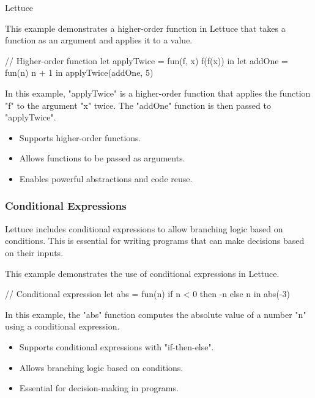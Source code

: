 \begin{notes}{Lettuce}
\begin{highlight}
        This example demonstrates a higher-order function in Lettuce that takes a function as an argument and applies it to a value.
    
    \begin{code}[Lettuce]
    // Higher-order function
    let applyTwice = fun(f, x) {
        f(f(x))
    } in
    let addOne = fun(n) {
        n + 1
    } in
    applyTwice(addOne, 5)
    \end{code}
    
        In this example, "applyTwice" is a higher-order function that applies the function "f" to the argument "x" twice. The "addOne" function is then passed to "applyTwice".
    
    \begin{itemize}
        \item Supports higher-order functions.
        \item Allows functions to be passed as arguments.
        \item Enables powerful abstractions and code reuse.
    \end{itemize}
    
    \end{highlight}
    
    \subsubsection*{Conditional Expressions}
    
    Lettuce includes conditional expressions to allow branching logic based on conditions. This is essential for writing programs that can make decisions based on their inputs.
    
    \begin{highlight}
    
        This example demonstrates the use of conditional expressions in Lettuce.
    
    \begin{code}[Lettuce]
    // Conditional expression
    let abs = fun(n) {
        if n < 0 then -n else n
    } in
    abs(-3)
    \end{code}
    
        In this example, the "abs" function computes the absolute value of a number "n" using a conditional expression.
    
        \begin{itemize}
            \item Supports conditional expressions with "if-then-else".
            \item Allows branching logic based on conditions.
            \item Essential for decision-making in programs.
        \end{itemize}
    

\end{highlight}
\end{notes}

